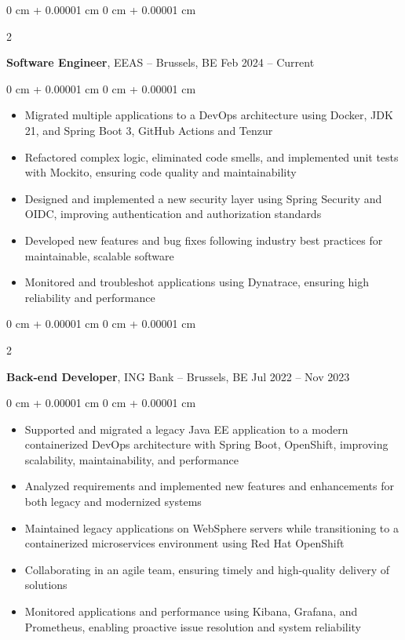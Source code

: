 \documentclass[10pt, letterpaper]{article}
\newenvironment{highlights}{
    \begin{itemize}[
        topsep=0.10 cm,
        parsep=0.10 cm,
        partopsep=0pt,
        itemsep=0pt,
        leftmargin=0 cm + 10pt
    ]
}{
    \end{itemize}
} %
\newenvironment{onecolentry}{
    \begin{adjustwidth}{
        0 cm + 0.00001 cm
    }{
        0 cm + 0.00001 cm
    }
}{
    \end{adjustwidth}
} %
\newenvironment{twocolentry}[2][]{
    \onecolentry
    \def\secondColumn{#2}
    \setcolumnwidth{\fill, 4.5 cm}
    \begin{paracol}{2}
}{
    \switchcolumn \raggedleft \secondColumn
    \end{paracol}
    \endonecolentry
} %
\begin{document}
        \begin{twocolentry}{
            Feb 2024 – Current
        }
            \textbf{Software Engineer}, EEAS -- Brussels, BE\end{twocolentry}

        \vspace{0.10 cm}
        
        \begin{onecolentry}
            \begin{highlights}
                \item Migrated multiple applications to a DevOps architecture using Docker, JDK 21, and Spring Boot 3, GitHub Actions and Tenzur
                \item Refactored complex logic, eliminated code smells, and implemented unit tests with Mockito, ensuring code quality and maintainability
                \item Designed and implemented a new security layer using Spring Security and OIDC, improving authentication and authorization standards
                \item Developed new features and bug fixes following industry best practices for maintainable, scalable software
                \item Monitored and troubleshot applications using Dynatrace, ensuring high reliability and performance
            \end{highlights}
        \end{onecolentry}
        
        \vspace{0.2 cm}

        \begin{twocolentry}{
            Jul 2022 – Nov 2023
        }
            \textbf{Back-end Developer}, ING Bank -- Brussels, BE\end{twocolentry}

        \vspace{0.10 cm}
        
        \begin{onecolentry}
            \begin{highlights}
                \item Supported and migrated a legacy Java EE application to a modern containerized DevOps architecture with Spring Boot, OpenShift, improving scalability, maintainability, and performance
                \item Analyzed requirements and implemented new features and enhancements for both legacy and modernized systems
                \item Maintained legacy applications on WebSphere servers while transitioning to a containerized microservices environment using Red Hat OpenShift
                \item Collaborating in an agile team, ensuring timely and high-quality delivery of solutions
                \item Monitored applications and performance using Kibana, Grafana, and Prometheus, enabling proactive issue resolution and system reliability
            \end{highlights}
        \end{onecolentry}
        
\end{document}
